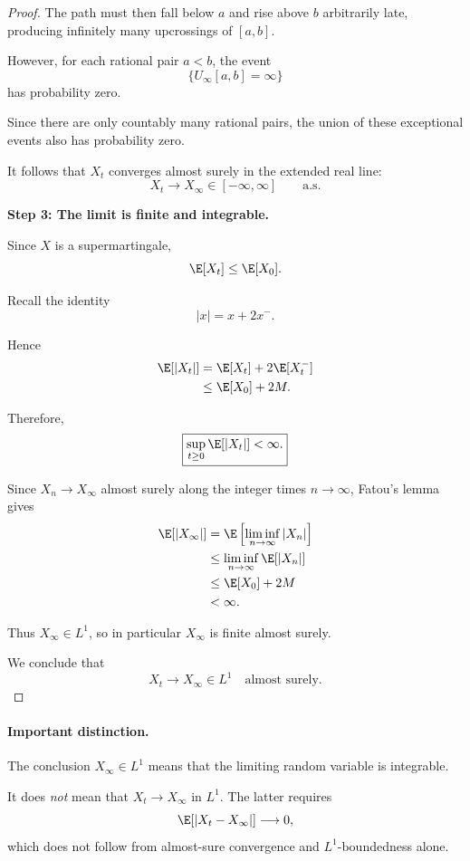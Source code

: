 \begin{proof}
The path must then fall below $a$ and rise above
$b$ arbitrarily late, producing infinitely many
upcrossings of $[a,b]$.

However, for each rational pair $a<b$, the event
\[
    \{U_\infty[a,b]=\infty\}
\]
has probability zero.

Since there are only countably many rational pairs,
the union of these exceptional events also has
probability zero.

It follows that $X_t$ converges almost surely
in the extended real line:
\[
    X_t\longrightarrow X_\infty
    \in[-\infty,\infty]
    \qquad\text{a.s.}
\]

\medskip
\noindent
\textbf{Step 3: The limit is finite and integrable.}

Since $X$ is a supermartingale,
\[
    \E[X_t]\leq\E[X_0].
\]

Recall the identity
\[
    |x|=x+2x^-.
\]

Hence
\[
\begin{aligned}
    \E[|X_t|]
    &=\E[X_t]+2\E[X_t^-]\\
    &\leq\E[X_0]+2M.
\end{aligned}
\]

Therefore,
\[
    \boxed{
    \sup_{t\geq0}\E[|X_t|]<\infty.
    }
\]

Since $X_n\to X_\infty$ almost surely along
the integer times $n\to\infty$, Fatou's lemma
gives
\[
\begin{aligned}
    \E[|X_\infty|]
    &=\E\left[\liminf_{n\to\infty}|X_n|\right]\\
    &\leq\liminf_{n\to\infty}\E[|X_n|]\\
    &\leq\E[X_0]+2M\\
    &<\infty.
\end{aligned}
\]

Thus $X_\infty\in L^1$, so in particular
$X_\infty$ is finite almost surely.

We conclude that
\[
    \boxed{
    X_t\to X_\infty\in L^1
    \quad\text{almost surely}.
    }
\]
\end{proof}

\paragraph{Important distinction.}
The conclusion $X_\infty\in L^1$ means that the
limiting random variable is integrable.

It does \emph{not} mean that $X_t\to X_\infty$
in $L^1$. The latter requires
\[
    \E[|X_t-X_\infty|]\longrightarrow0,
\]
which does not follow from almost-sure convergence
and $L^1$-boundedness alone.

